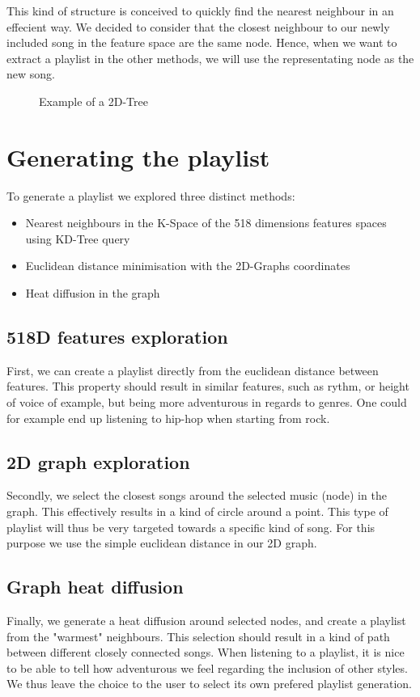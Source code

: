 This kind of structure is conceived to quickly find the nearest neighbour in an effecient way.
We decided to consider that the closest neighbour to our newly included song in the feature space are the same node. Hence, when we want to extract a playlist in the other methods, we will use the representating node as the new song. %

\begin{figure}[h!]
  \centering
  \caption{Example of a 2D-Tree}
  \label{fig:ex_tree}
\end{figure}

\section{Generating the playlist}

To generate a playlist we explored three distinct methods:
\begin{itemize}
\item Nearest neighbours in the K-Space of the 518 dimensions features spaces using KD-Tree query
\item Euclidean distance minimisation with the 2D-Graphs coordinates
\item Heat diffusion in the graph
\end{itemize}

\subsection{518D features exploration}
First, we can create a playlist directly from the euclidean distance between features. This property should result in similar features, such as rythm, or height of voice of example, but being more adventurous in regards to genres. One could for example end up listening to hip-hop when starting from rock.

\subsection{2D graph exploration}
Secondly, we select the closest songs around the selected music (node) in the graph. This effectively results in a kind of circle around a point. This type of playlist will thus be very targeted towards a specific kind of song. For this purpose we use the simple euclidean distance in our 2D graph.

\subsection{Graph heat diffusion}
Finally, we generate a heat diffusion around selected nodes, and create a playlist from the "warmest" neighbours. This selection should result in a kind of path between different closely connected songs. 
When listening to a playlist, it is nice to be able to tell how adventurous we feel regarding the inclusion of other styles. We thus leave the choice to the user to select its own prefered playlist generation.



\begin{figure}[h!]
  \centering
  \caption{}
  \label{fig:}
\end{figure}

